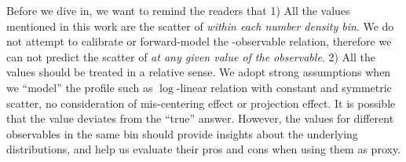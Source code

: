 \documentclass[fleqn,usenatbib,useAMS,english]{mnras}
\begin{document}
    Before we dive in, we want to remind the readers that
    1) All the \sigmh{} values mentioned in this work are the scatter of \mvir{} \emph{within each
    number density bin}. We do not attempt to calibrate or forward-model the \mvir{}-observable
    relation, therefore we can not predict the scatter of \mvir{} \emph{at any given value of
    the observable}.
    2) All the \sigmh{} values should be treated in a relative sense. 
    We adopt strong
    assumptions when we ``model'' the \dsigma{} profile such as $\log$-linear relation with
    constant and symmetric scatter, no consideration of mis-centering effect or projection effect.
    It is possible that the \sigmh{} value deviates from the ``true'' answer.
    However, the \sigmh{} values for different observables in the same bin should provide
    insights about the underlying \mvir{} distributions, and help us evaluate their pros and cons
    when using them as \mvir{} proxy.
\end{document}
